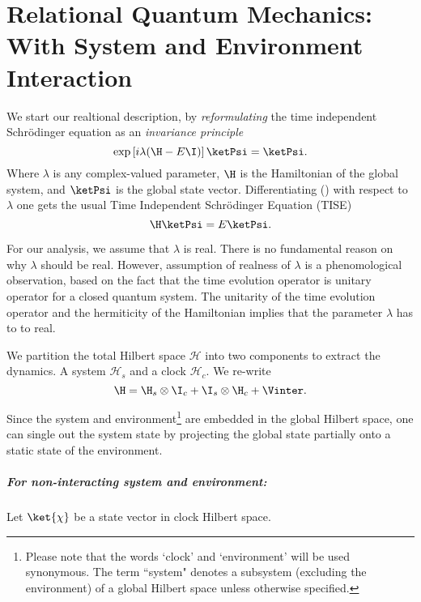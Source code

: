 \chapter[Quantum Relational Dynamics for Interacting Quantum Systems]{Relational Quantum Mechanics: With System and Environment Interaction\label{chap:sebgem_Rel}}

We start our realtional description, by \emph{reformulating} the time independent Schr\"odinger equation as an \emph{invariance principle}~\cite{Gemsheim:2023izg}
\begin{equation}
    \label{eq:invariance_principle}
        \exp\left[i\lambda(\H - E\I)\right] \ketPsi = \ketPsi. 
\end{equation}
Where  \(\lambda\) is any complex-valued parameter, $\H$ is the Hamiltonian of the global system, and \(\ketPsi\) is the global state vector. Differentiating () with respect to \(\lambda\) one gets  the usual Time Independent Schr\"odinger Equation (TISE)
\begin{equation*}
    \H \ketPsi = E \ketPsi.
\end{equation*}

For our analysis, we assume that \(\lambda\) is real. There is no fundamental reason on why \(\lambda\)
should be real. However, assumption of realness of \(\lambda\) is a phenomological observation, 
based on the fact that the time evolution operator is unitary operator for a
closed quantum system. The unitarity of the time evolution operator and  the hermiticity of the Hamiltonian
implies that the parameter \(\lambda\) has to to real. 


We partition the total Hilbert space $\mathcal{H}$ into two components to extract the dynamics. A system \(\mathcal{H}_s\) and a clock \(\mathcal{H}_c\). We re-write 
\begin{equation}
    \H = \H_s \otimes \I_c + \I_s \otimes \H_c + \Vinter .
\end{equation}

Since the system and environment\footnote{Please note that the words `clock' and `environment' will be used synonymous. The term ``system" denotes a subsystem (excluding the environment) of a global Hilbert space unless otherwise specified.} are embedded in the global Hilbert space, one can single
out the system state by projecting the global state partially onto a static state of the environment. 

\paragraph{For non-interacting system and environment:} Let \(\ket{\chi}\) be a state vector 
in clock Hilbert space. 

